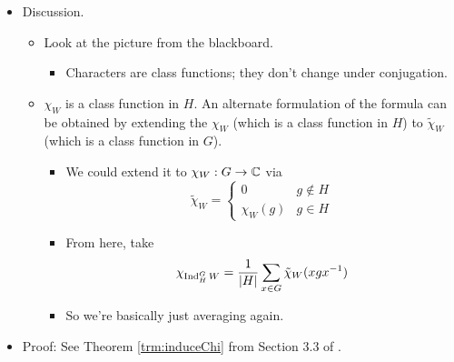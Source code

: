 \documentclass[../notes.tex]{subfiles}
\begin{document}
\begin{itemize}
\begin{equation*}
    \end{equation*}
    \item Discussion.
    \begin{itemize}
        \item Look at the picture from the blackboard.
        \begin{itemize}
            \item Characters are class functions; they don't change under conjugation.
        \end{itemize}
        \item $\chi_W$ is a class function in $H$. An alternate formulation of the formula can be obtained by extending the $\chi_W$ (which is a class function in $H$) to $\tilde{\chi}_W$ (which is a class function in $G$).
        \begin{itemize}
            \item We could extend it to $\chi_W:G\to\mathbb{C}$ via
            \begin{equation*}
                \tilde{\chi}_W =
                \begin{cases}
                    0 & g\notin H\\
                    \chi_W(g) & g\in H
                \end{cases}
            \end{equation*}
            \item From here, take
            \begin{equation*}
                \chi_{\operatorname{Ind}_H^GW} = \frac{1}{|H|}\sum_{x\in G}\tilde{\chi}_W(xgx^{-1})
            \end{equation*}
            \item So we're basically just averaging again.
        \end{itemize}
    \end{itemize}
    \item Proof: See Theorem \ref{trm:induceChi} from Section 3.3 of \textcite{bib:Serre}.
        

\end{itemize}
\end{document}
